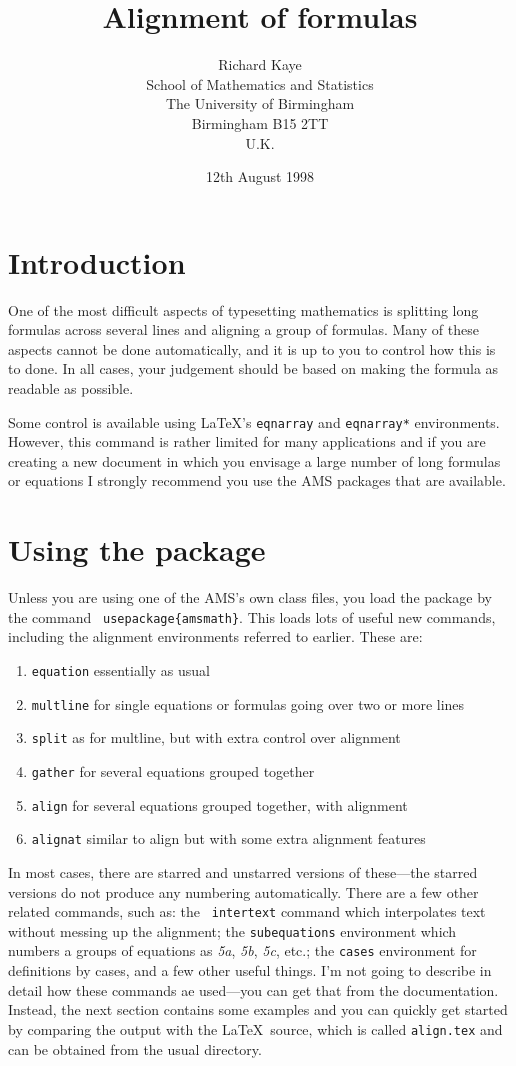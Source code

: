\documentclass[a4paper]{article}
\title{Alignment of formulas}
\author{Richard Kaye\\School of Mathematics and Statistics\\
The University of Birmingham\\Birmingham B15 2TT\\U.K.}%
\date{12th August 1998}
\newcommand{\fn}[1]{\texttt{#1}}
\newcommand{\cn}[1]{\texttt{\char92 #1}}
\begin{document}
\maketitle

\section{Introduction}

One of the most difficult aspects of typesetting mathematics is
splitting long formulas across several lines and aligning a group
of formulas.  Many of these aspects cannot be done automatically,
and it is up to you to control how this is to done. In all cases,
your judgement should be based on making the formula as readable
as possible.

Some control is available using \LaTeX's \fn{eqnarray} and
\fn{eqnarray*} environments.  However, this command is rather
limited for many applications and if you are creating a new
document in which you envisage a large number of long formulas or
equations I strongly recommend you use the AMS packages that are
available.

\section{Using the package}

Unless you are using one of the AMS's own class files, you load
the package by the command \cn{usepackage}\verb|{amsmath}|.  This
loads lots of useful new commands, including the alignment
environments referred to earlier. These are:
\begin{enumerate}
\item \fn{equation} essentially as usual \item \fn{multline} for
single equations or formulas going over two or more lines \item
\fn{split} as for multline, but with extra control over alignment
\item \fn{gather} for several equations grouped together \item
\fn{align} for several equations grouped together, with alignment
\item \fn{alignat} similar to align but with some extra alignment
features
\end{enumerate}

In most cases, there are starred and unstarred versions of
these---the starred versions do not produce any numbering
automatically.  There are a few other related commands, such as:
the \cn{intertext} command which interpolates text without messing
up the alignment; the \fn{subequations} environment which numbers
a groups of equations as \textit{5a}, \textit{5b}, \textit{5c},
etc.; the \fn{cases} environment for definitions by cases, and a
few other useful things.  I'm not going to describe in detail how
these commands ae used---you can get that from the documentation.
Instead, the next section contains some examples and you can
quickly get started by comparing the output with the \LaTeX\
source, which is called \fn{align.tex} and can be obtained from
the usual directory.
\end{document}
